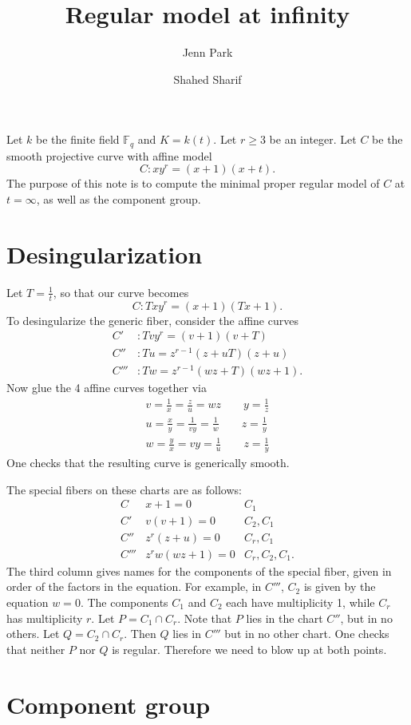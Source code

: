 \documentclass{article}
\theoremstyle{plain}
\theoremstyle{definition}
\theoremstyle{remark}
\newcommand{\F}{\ensuremath{\mathbb{F}}}
\begin{document}
\title{Regular model at infinity}
\author{Jenn Park \and Shahed Sharif}
\maketitle

Let $k$ be the finite field $\F_q$ and $K = k(t)$. Let $r \geq 3$ be an integer. Let $C$ be the smooth projective curve with affine model 
\[
C: xy^r = (x+1)(x+t).
\]
The purpose of this note is to compute the minimal proper regular model of $C$ at $t = \infty$, as well as the component group.

\section{Desingularization}
\label{sec:desingularization}

Let $T = \frac{1}{t}$, so that our curve becomes
\[
C: Txy^r = (x+1)(Tx+1).
\]
To desingularize the generic fiber, consider the affine curves
\begin{align*}
  C'&: Tvy^r = (v+1)(v+T) \\
  C''&: Tu = z^{r-1}(z+uT)(z+u) \\
  C'''&: Tw = z^{r-1}(wz+T)(wz+1).
\end{align*}
Now glue the 4 affine curves together via
\begin{gather*}
  v = \frac{1}{x} = \frac{z}{u} = wz \qquad y = \frac{1}{z} \\
  u = \frac{x}{y} = \frac{1}{vy} = \frac{1}{w} \qquad  z = \frac{1}{y}\\
  w = \frac{y}{x} = vy = \frac{1}{u} \qquad z = \frac{1}{y}
\end{gather*}
One checks that the resulting curve is generically smooth.

The special fibers on these charts are as follows:
\[
\begin{array}{lll}
  C & x + 1 = 0 & C_1 \\
  C' & v(v + 1) = 0 & C_2, C_1 \\
  C'' & z^r(z + u) = 0 & C_r, C_1 \\
  C''' & z^rw(wz+1) = 0 & C_r, C_2, C_1.
\end{array}
\]
The third column gives names for the components of the special fiber, given in order of the factors in the equation. For example, in $C'''$, $C_2$ is given by the equation $w = 0$. The components $C_1$ and $C_2$ each have multiplicity 1, while $C_r$ has multiplicity $r$. Let $P = C_1 \cap C_r$. Note that $P$ lies in the chart $C''$, but in no others. Let $Q = C_2 \cap C_r$. Then $Q$ lies in $C'''$ but in no other chart. One checks that neither $P$ nor $Q$ is regular. Therefore we need to blow up at both points.

\section{Component group}
\label{sec:component-group}




\end{document}
